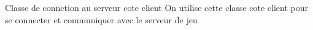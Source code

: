 Classe de connction au serveur cote client On utilise cette classe cote client pour se connecter et communiquer avec le serveur de jeu ~\newline
 